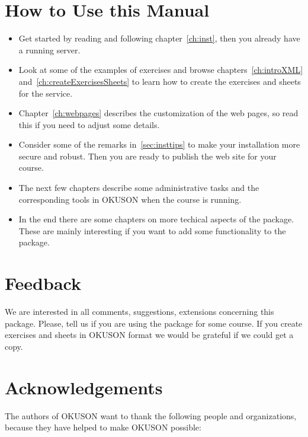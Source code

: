 \documentclass[12pt,openany,a4paper]{book}
\newcommand{\OKUSON}{\textsf{OKUSON}}
\begin{document}
\section{How to Use this Manual}

\begin{itemize}
\item Get started by reading and following chapter~\ref{ch:inst}, then you
already have a running server.
\item Look at some of the examples of exercises and browse
chapters~\ref{ch:introXML} and~\ref{ch:createExercisesSheets} to
learn how to create the exercises and sheets for the service. 
\item Chapter~\ref{ch:webpages} describes the customization of the web
pages, so read this if you need to adjust some details. 
\item Consider some of the remarks in~\ref{sec:insttips} to make your 
installation more
secure and robust. Then you are ready to publish the web site for your
course.
\item The next few chapters describe some administrative tasks and the
corresponding tools in {\OKUSON} when the course is running.
\item In the end there are some chapters on more techical aspects of the
package. These are mainly interesting if you want to add some functionality
to the package.
\end{itemize}

\section{Feedback}

We are interested  in all comments, suggestions,  extensions concerning this
package. Please, tell  us if you are  using the package for  some course. If
you create exercises and sheets in  {\OKUSON} format we would be grateful if
we could get a copy.

\section{Acknowledgements}

The authors of {\OKUSON} want to thank the following people and
organizations, because they have helped to make {\OKUSON} possible:
\end{document}
